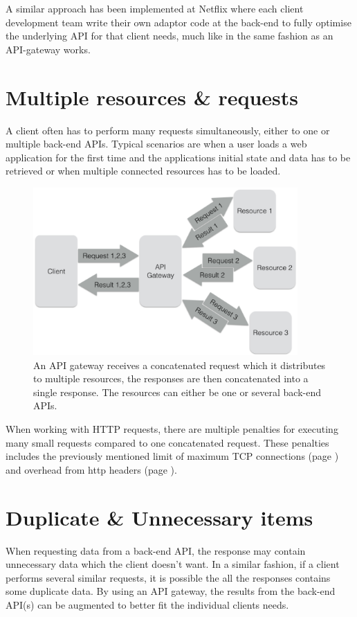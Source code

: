 \documentclass{cslthse-msc}
\begin{document}
A similar approach has been implemented at Netflix where each client development team write their own adaptor code at the back-end to fully optimise the underlying API for that client needs, much like in the same fashion as an API-gateway works\cite{netflix}.

\section{Multiple resources \& requests}
A client often has to perform many requests simultaneously, either to one or multiple back-end APIs. Typical scenarios are when a user loads a web application for the first time and the applications initial state and data has to be retrieved or when multiple connected resources has to be loaded.

\begin{figure}[H]
  \centering
    \begin{center}
      \includegraphics[width=0.9\textwidth]{images/api_gateway_concatenation.png}
    \end{center}
  \caption{An API gateway receives a concatenated request which it distributes to multiple resources, the responses are then concatenated into a single response. The resources can either be one or several back-end APIs.}
\end{figure}

When working with HTTP requests, there are multiple penalties for executing many small requests compared to one concatenated request. These penalties includes the previously mentioned limit of maximum TCP connections (page \pageref{max_tcp}) and overhead from http headers (page \pageref{headers}).

\section{Duplicate \& Unnecessary items}
When requesting data from a back-end API, the response may contain unnecessary data which the client doesn't want. In a similar fashion, if a client performs several similar requests, it is possible the all the responses contains some duplicate data. By using an API gateway, the results from the back-end API(s) can be augmented to better fit the individual clients needs.
\end{document}
